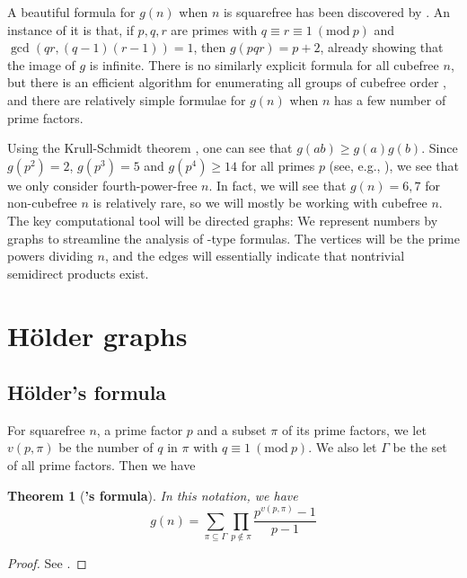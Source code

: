 \documentclass{article}
\newcommand{\Mod}[1]{\ (\mathrm{mod} \ #1)}
\theoremstyle{plain}
\newtheorem{fact}{Theorem}[section]
\theoremstyle{definition}
\begin{document}
A beautiful formula for $g(n)$ when $n$ is squarefree has been discovered by  {\cite[Th.~5.1]{gnumoas}}. An instance of it is that, if $p, q, r$ are primes with $q \equiv r \equiv 1 \Mod{p}$ and $\gcd(qr, (q-1)(r-1)) = 1$, then $g(pqr) = p + 2$, already showing that the image of $g$ is infinite. There is no similarly explicit formula for all cubefree $n$, but there is an efficient algorithm for enumerating all groups of cubefree order {\cite{cubefree}}, and there are relatively simple formulae for $g(n)$ when $n$ has a few number of prime factors.

Using the Krull-Schmidt theorem {\cite{hungerford}}, one can see that $g(ab) \ge g(a)g(b)$. Since \mbox{$g(p^2) = 2$,} $g(p^3) = 5$ and $g(p^4) \ge 14$ for all primes $p$ (see, e.g., \cite[Th.~3.1]{gnumoas}), we see that we only consider fourth-power-free $n$. In fact, we will see that $g(n) = 6, 7$ for non-cubefree $n$ is relatively rare, so we will mostly be working with cubefree $n$. The key computational tool will be directed graphs: We represent numbers by graphs to streamline the analysis of -type formulas. The vertices will be the prime powers dividing $n$, and the edges will essentially indicate that nontrivial semidirect products exist.

\section{Hölder graphs}
\subsection{Hölder's formula}
For squarefree $n$, a prime factor $p$ and a subset $\pi$ of its prime factors, we let $v(p, \pi)$ be the number of $q$ in $\pi$ with $q \equiv 1 \Mod{p}$. We also let $\Gamma$ be the set of all prime factors. Then we have
\begin{fact}[\textbf{'s formula}] In this notation, we have
	\begin{equation*}
		g(n) = \sum_{\pi \subseteq \Gamma} \prod_{p \notin \pi} \frac{p^{v(p, \pi)} - 1}{p - 1}
	\end{equation*}
\end{fact}
\begin{proof} See {\cite[Th.~5.1]{gnumoas}}. \end{proof}
\end{document}
